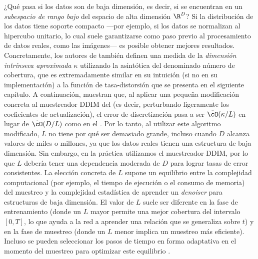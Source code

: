 \documentclass[../../book-main.tex]{subfiles}
\begin{document}
\begin{remark}
    ¿Qué pasa si los datos son de baja dimensión, es decir, si se encuentran en un
    \textit{subespacio de rango bajo} del espacio de alta dimensión
    \(\R^{D}\)? Si la distribución de los datos tiene soporte compacto ---por ejemplo,
    si los datos se normalizan al hipercubo unitario, lo cual suele
    garantizarse como paso previo al procesamiento de datos reales, como
    las imágenes--- es posible obtener mejores resultados. Concretamente, los autores de
    \cite{li2024d} también definen una medida de la \textit{dimensión intrínseca
    aproximada} \(\kappa\) utilizando la asintótica del denominado
    número de cobertura, que es extremadamente similar en su intuición (si no
    en su implementación) a la función de tasa-distorsión que se presenta en
    el siguiente capítulo. A continuación, muestran que, al aplicar una pequeña
    modificación concreta al muestreador DDIM del
     (es decir, perturbando ligeramente los
    coeficientes de actualización), el error de discretización pasa a ser
    \(\tilde{\cO}(\kappa/L)\) en lugar de \(\tilde{\cO}(D/L)\) como en el
    . Por lo tanto, al utilizar este
    algoritmo modificado, \(L\) no tiene por qué ser demasiado grande, incluso cuando
    \(D\) alcanza valores de miles o millones, ya que los datos reales tienen
    una estructura de baja dimensión. Sin embargo, en la práctica utilizamos el muestreador DDIM,
    por lo que \(L\) debería tener una dependencia moderada de \(D\)
    para lograr tasas de error consistentes. La elección concreta de \(L\)
    supone un equilibrio entre la complejidad computacional (por ejemplo, el tiempo de ejecución o
    el consumo de memoria) del muestreo y la complejidad estadística de
    aprender un \textit{denoiser} para estructuras de baja dimensión. El valor de
    \(L\) suele ser diferente en la fase de entrenamiento (donde un \(L\) mayor
        permite una mejor cobertura del intervalo \([0, T]\), lo que ayuda
    a la red a aprender una relación que se generaliza sobre \(t\))
    y en la fase de muestreo (donde un \(L\) menor implica un muestreo más eficiente).
    Incluso se pueden seleccionar los pasos de tiempo en forma adaptativa en el momento del muestreo
    para optimizar este equilibrio \cite{bao2022analytic}.
\end{remark}
\end{document}
